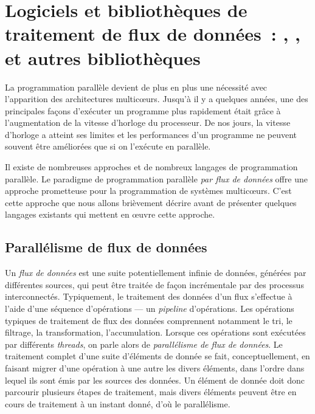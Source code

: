
\chapter{Logiciels et bibliothèques de traitement de flux de donn\'ees~: , ,  et autres bibliothèques }
\label{outils_connus}
\label{outils_connus.chap}


La programmation parall\`ele devient de plus en plus une n\'ecessit\'e avec l'apparition des architectures multicœurs. Jusqu'\`a il y a quelques ann\'ees, une des principales fa\c{c}ons d'ex\'ecuter un programme plus rapidement \'etait gr\^ace \`a l'augmentation de la vitesse d'horloge du processeur. De nos jours, la vitesse d'horloge a atteint ses limites et les performances d'un programme ne peuvent souvent \^etre am\'elior\'ees que si on l'ex\'ecute en parall\`ele. 

Il existe de nombreuses approches et de nombreux langages de programmation parall\`ele.
%
Le paradigme de programmation parall\`ele \emph{par flux de donn\'ees} offre une approche prometteuse pour la programmation de syst\`emes multicœurs. C'est cette approche que nous allons bri\`evement d\'ecrire avant de pr\'esenter quelques langages existants qui mettent en \oe{}uvre cette approche.

\section{Parall\'elisme de flux de donn\'ees}


Un \emph{flux de donn\'ees} est une suite potentiellement infinie de donn\'ees, g\'en\'er\'ees par diff\'erentes sources, qui peut \^etre trait\'ee de fa\c{c}on incr\'ementale par des processus interconnect\'es. Typiquement, le traitement des donn\'ees d'un flux s'effectue \`a l'aide d'une s\'equence d'op\'erations --- un \emph{pipeline} d'op\'erations. Les op\'erations typiques de traitement de flux des donn\'ees comprennent notamment le tri, le filtrage,  la transformation, l'accumulation. Lorsque ces op\'erations sont ex\'ecut\'ees par diff\'erents \emph{threads}, on parle alors de \emph{parall\'elisme de flux de donn\'ees}. Le traitement complet d'une suite d'\'el\'ements de donn\'ee se fait, conceptuellement, en faisant migrer d'une op\'eration \`a une autre les divers \'el\'ements, dans l'ordre dans lequel ils sont \'emis par les sources des donn\'ees.
%
Un \'el\'ement de donn\'ee doit donc parcourir plusieurs \'etapes de traitement, mais divers \'el\'ements peuvent \^etre en cours de traitement \`a un instant donn\'e, d'o\`u le parall\'elisme.

